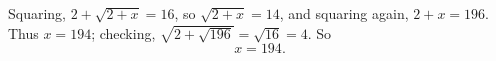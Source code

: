 Squaring, $2+\sqrt{2+x}=16$, so $\sqrt{2+x}=14$, and squaring again, $2+x=196$. Thus $x=194$; checking, $\sqrt{2+\sqrt{196}}=\sqrt{16}=4$. So
\[\boxed{x=194}.\]
